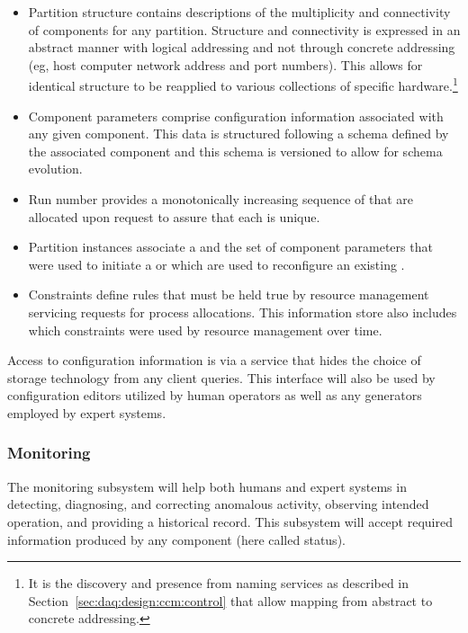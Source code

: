 \begin{itemize}

\item Partition structure contains descriptions of the multiplicity and connectivity of  components for any partition. 
  Structure and connectivity is expressed in an abstract manner with logical addressing and not through concrete addressing (eg, host computer network address and port numbers). 
  This allows for identical structure to be reapplied to various collections of specific hardware.\footnote{It is the discovery and presence from naming services as described in Section~\ref{sec:daq:design:ccm:control} that allow mapping from abstract to concrete addressing.}

\item Component parameters comprise configuration information associated with any given  component.  This data is structured following a schema defined by the associated component and this schema is versioned to allow for schema evolution.

\item Run number provides a monotonically increasing sequence of  that are allocated upon request to assure that each is unique.

\item Partition instances associate a  and the set of component parameters that were used to initiate a  or which are used to reconfigure an existing .  

\item Constraints define rules that must be held true by resource management servicing requests for process allocations.  This information store also includes which constraints were used by resource management over time.
\end{itemize}


Access to configuration information is via a service that hides the choice of storage technology from any client queries.
This interface will also be used by configuration editors utilized by human operators as well as any  generators employed by expert systems.

\subsubsection{Monitoring}
\label{sec:daq:design:ccm:monitoring}

The  monitoring subsystem will help both humans and expert systems in detecting, diagnosing, and correcting anomalous activity, observing intended operation, and providing a historical record.
This subsystem will accept required information produced by any  component (here called status).

